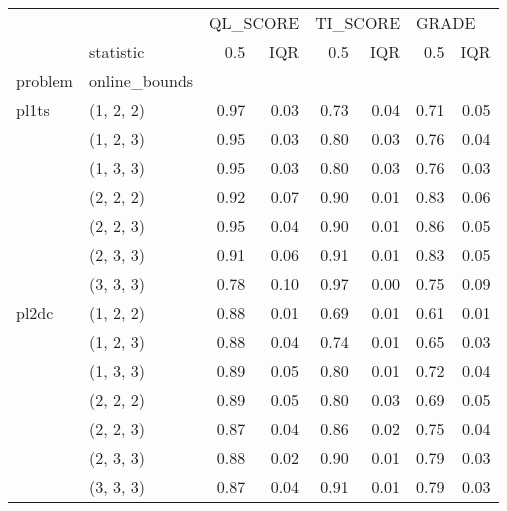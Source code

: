 \begin{tabular}{llrrrrrr}
\toprule
      & {} & \multicolumn{2}{l}{QL\_SCORE} & \multicolumn{2}{l}{TI\_SCORE} & \multicolumn{2}{l}{GRADE} \\
      & statistic &      0.5 &  IQR &      0.5 &  IQR &   0.5 &  IQR \\
problem & online\_bounds &          &      &          &      &       &      \\
\midrule
pl1ts & (1, 2, 2) &     0.97 & 0.03 &     0.73 & 0.04 &  0.71 & 0.05 \\
      & (1, 2, 3) &     0.95 & 0.03 &     0.80 & 0.03 &  0.76 & 0.04 \\
      & (1, 3, 3) &     0.95 & 0.03 &     0.80 & 0.03 &  0.76 & 0.03 \\
      & (2, 2, 2) &     0.92 & 0.07 &     0.90 & 0.01 &  0.83 & 0.06 \\
      & (2, 2, 3) &     0.95 & 0.04 &     0.90 & 0.01 &  0.86 & 0.05 \\
      & (2, 3, 3) &     0.91 & 0.06 &     0.91 & 0.01 &  0.83 & 0.05 \\
      & (3, 3, 3) &     0.78 & 0.10 &     0.97 & 0.00 &  0.75 & 0.09 \\
pl2dc & (1, 2, 2) &     0.88 & 0.01 &     0.69 & 0.01 &  0.61 & 0.01 \\
      & (1, 2, 3) &     0.88 & 0.04 &     0.74 & 0.01 &  0.65 & 0.03 \\
      & (1, 3, 3) &     0.89 & 0.05 &     0.80 & 0.01 &  0.72 & 0.04 \\
      & (2, 2, 2) &     0.89 & 0.05 &     0.80 & 0.03 &  0.69 & 0.05 \\
      & (2, 2, 3) &     0.87 & 0.04 &     0.86 & 0.02 &  0.75 & 0.04 \\
      & (2, 3, 3) &     0.88 & 0.02 &     0.90 & 0.01 &  0.79 & 0.03 \\
      & (3, 3, 3) &     0.87 & 0.04 &     0.91 & 0.01 &  0.79 & 0.03 \\
\bottomrule
\end{tabular}
